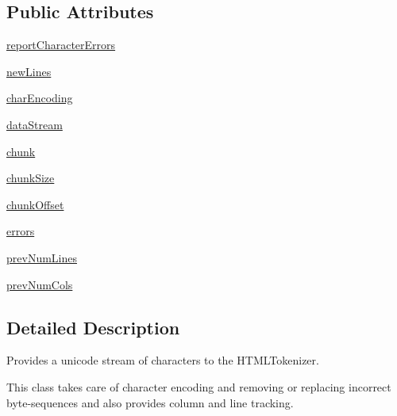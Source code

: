 \subsection*{Public Attributes}
\begin{DoxyCompactItemize}
\item 
\hyperlink{classpip_1_1__vendor_1_1html5lib_1_1__inputstream_1_1HTMLUnicodeInputStream_a5539776cd96dcdc3ec738851da409e06}{report\+Character\+Errors}
\item 
\hyperlink{classpip_1_1__vendor_1_1html5lib_1_1__inputstream_1_1HTMLUnicodeInputStream_a4c9d04aa663eb0b65f80875e86da5483}{new\+Lines}
\item 
\hyperlink{classpip_1_1__vendor_1_1html5lib_1_1__inputstream_1_1HTMLUnicodeInputStream_afd40aa82e6f6a74428042506fbedfb00}{char\+Encoding}
\item 
\hyperlink{classpip_1_1__vendor_1_1html5lib_1_1__inputstream_1_1HTMLUnicodeInputStream_a980e3c5c14179c94aa5bb25a90ae9e6a}{data\+Stream}
\item 
\hyperlink{classpip_1_1__vendor_1_1html5lib_1_1__inputstream_1_1HTMLUnicodeInputStream_a62d0b0d12924a1c11b383d0716c58a74}{chunk}
\item 
\hyperlink{classpip_1_1__vendor_1_1html5lib_1_1__inputstream_1_1HTMLUnicodeInputStream_a86c396e76c93c5e0eea2d46178b8877a}{chunk\+Size}
\item 
\hyperlink{classpip_1_1__vendor_1_1html5lib_1_1__inputstream_1_1HTMLUnicodeInputStream_a75e9836565c7b9e96fced4c5e92d7acc}{chunk\+Offset}
\item 
\hyperlink{classpip_1_1__vendor_1_1html5lib_1_1__inputstream_1_1HTMLUnicodeInputStream_aaa48e9f61b08992b6ee0d71faa37b07c}{errors}
\item 
\hyperlink{classpip_1_1__vendor_1_1html5lib_1_1__inputstream_1_1HTMLUnicodeInputStream_a3527722a24b47ffd5c2e5060f24c7bca}{prev\+Num\+Lines}
\item 
\hyperlink{classpip_1_1__vendor_1_1html5lib_1_1__inputstream_1_1HTMLUnicodeInputStream_a378d9189f801fbc4b31c6c161c8b3ef8}{prev\+Num\+Cols}
\end{DoxyCompactItemize}


\subsection{Detailed Description}
\begin{DoxyVerb}Provides a unicode stream of characters to the HTMLTokenizer.

This class takes care of character encoding and removing or replacing
incorrect byte-sequences and also provides column and line tracking.\end{DoxyVerb}
 

